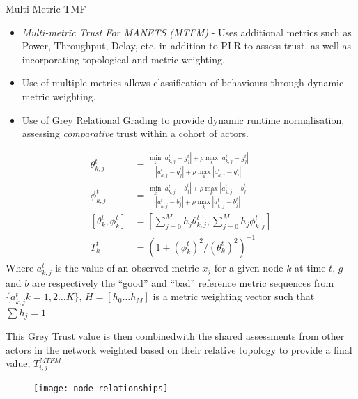 \documentclass{beamer}
\begin{document}
\begin{frame}[allowframebreaks]{Multi-Metric TMF}
  \begin{itemize} 
    \item \emph{Multi-metric Trust For MANETS (MTFM)} \autocite{Guo11} - Uses additional metrics such as Power, Throughput, Delay, etc. in addition to PLR to assess trust, as well as incorporating topological and metric weighting.
    \item Use of multiple metrics allows classification of behaviours through dynamic metric weighting.
    \item Use of Grey Relational Grading to provide dynamic runtime normalisation, assessing \emph{comparative} trust within a cohort of actors.
  \end{itemize}
  \framebreak
\begin{align}
  \label{eq:grcg}
  \theta_{k,j}^t &= \frac{\min_k|a_{k,j}^t - g_j^t| + \rho \max_k|a_{k,j}^t-g_j^t|}{|a_{k,j}^t-g_j^t| + \rho \max_k|a_{k,j}^t-g_j^t|} \\
  \label{eq:grcb}
  \phi_{k,j}^t &= \frac{\min_k|a_{k,j}^t - b_j^t| + \rho \max_k|a_{k,j}^t-b_j^t|}{|a_{k,j}^t-b_j^t| + \rho \max_k|a_{k,j}^t-b_j^t|}  \\
  \label{eq:grc}
  [\theta_k^t, \phi_k^t]& = \left[\sum_{j=0}^M h_j \theta_{k,j}^t,\sum_{j=0}^M h_j \phi_{k,j}^t \right]\\
  \label{eq:grcT}
  T_k^t &= ({1+{(\phi_k^t)^2}/{(\theta_k^t)^2}})^{-1}
\end{align}
Where  $a_{k,j}^t$ is the value of an observed metric $x_j$ for a given node $k$ at time $t$,  $g$ and $b$ are respectively the ``good'' and ``bad'' reference metric sequences from $\{a_{k,j}^t k=1,2\dots K\}$, $H=[h_0\dots h_M]$ is a metric weighting vector such that $\sum h_j = 1$

  \framebreak

  This Grey Trust value is then combined\footnotemark with the shared assessments from other actors in the network weighted based on their relative topology to provide a final value; $T_{i,j}^{MTFM}$
    \begin{figure}[h]
      \centering
      \texttt{[image: node\_relationships]}
      \label{fig:node_relationships}
    \end{figure}

\end{frame}
\end{document}
